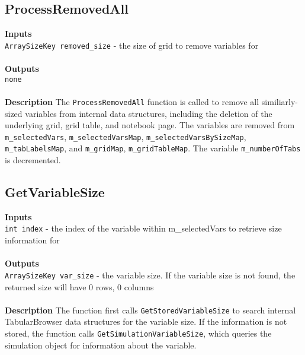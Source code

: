 \documentclass[11pt]{article} %
\begin{document}
\subsection{ProcessRemovedAll}
\textbf{Inputs} \\
\texttt{ArraySizeKey removed\_size} - the size of grid to remove variables for \\
\\
\textbf{Outputs}\\
\texttt{none} \\
\\
\textbf{Description}
The \texttt{ProcessRemovedAll} function is called to remove all similiarly-sized variables from internal data structures, including the deletion of the underlying grid, grid table, and notebook page. The variables are removed from \texttt{m\_selectedVars}, \texttt{m\_selectedVarsMap}, \texttt{m\_selectedVarsBySizeMap}, \texttt{m\_tabLabelsMap}, and \texttt{m\_gridMap}, \texttt{m\_gridTableMap}. The variable \texttt{m\_numberOfTabs} is decremented.

\subsection{GetVariableSize}
\textbf{Inputs} \\
\texttt{int index} - the index of the variable within m\_selectedVars to retrieve size information for \\
\\
\textbf{Outputs}\\
\texttt{ArraySizeKey var\_size} - the variable size.  If the variable size is not found, the returned size will have 0 rows, 0 columns \\
\\
\textbf{Description}
The function first calls \texttt{GetStoredVariableSize} to search internal TabularBrowser data structures for the variable size.  If the information is not stored, the function calls \texttt{GetSimulationVariableSize}, which queries the simulation object for information about the variable.  
\end{document}
